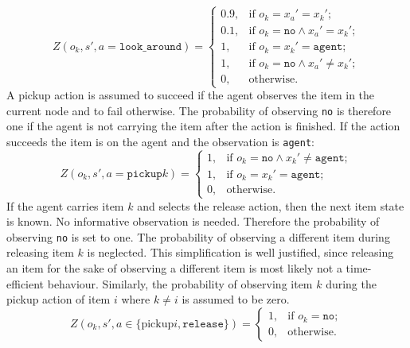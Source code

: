 \begin{equation}\label{eq:lookaround}
    Z(o_k, s', a=\texttt{look\_around}) = \begin{cases}
    0.9,& \text{if } o_k=x_a'=x_k';\\
    0.1, &\text{if } o_k=\texttt{no} \land x_a'=x_k';\\
    1,& \text{if }o_k=x_k'=\texttt{agent};\\
    1,& \text{if }o_k=\texttt{no}\land x_a'\neq x_k';
    \\0, &\text{otherwise}. \end{cases}
\end{equation}
A pickup action is assumed to succeed if the agent observes the item in the current node and to fail otherwise. The probability of observing \texttt{no} is therefore one if the agent is not carrying the item after the action is finished. If the action succeeds the item is on the agent and the observation is \texttt{agent}:
\begin{equation}\label{eq:pickup}
    Z(o_k, s', a=\texttt{pickup}k) = \begin{cases}
    1, &\text{if } o_k=\texttt{no} \land x_k'\neq \texttt{agent};\\
    1,& \text{if }o_k=x_k'=\texttt{agent};\\
    0, &\text{otherwise}. \end{cases}
\end{equation}
If the agent carries item $k$ and selects the release action, then the next item state is known. No informative observation is needed. Therefore the probability of observing \texttt{no} is set to one. The probability of observing a different item during releasing item $k$ is neglected. This simplification is well justified, since releasing an item for the sake of observing a different item is most likely not a time-efficient behaviour. Similarly, the probability of observing item $k$ during the pickup action of item $i$ where $k\neq i$ is assumed to be zero. 
\begin{equation}\label{eq:Orelease}
    Z(o_k, s', a\in\{\text{pickup}i, \texttt{release}\}) = \begin{cases}
    1,& \text{if } o_k=\texttt{no};\\
    0,& \text{otherwise}.\end{cases}
\end{equation}
